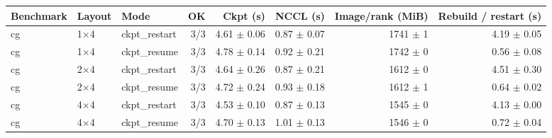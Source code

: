 \begin{tabular}{lllrrrrr}
\toprule
Benchmark & Layout & Mode & OK & Ckpt (s) & NCCL (s) & Image/rank (MiB) & Rebuild / restart (s) \\
\midrule
cg & 1$\times$4 & ckpt\_restart & 3/3 & 4.61 $\pm$ 0.06 & 0.87 $\pm$ 0.07 & 1741 $\pm$ 1 & 4.19 $\pm$ 0.05 \\
cg & 1$\times$4 & ckpt\_resume & 3/3 & 4.78 $\pm$ 0.14 & 0.92 $\pm$ 0.21 & 1742 $\pm$ 0 & 0.56 $\pm$ 0.08 \\
cg & 2$\times$4 & ckpt\_restart & 3/3 & 4.64 $\pm$ 0.26 & 0.87 $\pm$ 0.21 & 1612 $\pm$ 0 & 4.51 $\pm$ 0.30 \\
cg & 2$\times$4 & ckpt\_resume & 3/3 & 4.72 $\pm$ 0.24 & 0.93 $\pm$ 0.18 & 1612 $\pm$ 1 & 0.64 $\pm$ 0.02 \\
cg & 4$\times$4 & ckpt\_restart & 3/3 & 4.53 $\pm$ 0.10 & 0.87 $\pm$ 0.13 & 1545 $\pm$ 0 & 4.13 $\pm$ 0.00 \\
cg & 4$\times$4 & ckpt\_resume & 3/3 & 4.70 $\pm$ 0.13 & 1.01 $\pm$ 0.13 & 1546 $\pm$ 0 & 0.72 $\pm$ 0.04 \\
\bottomrule
\end{tabular}
